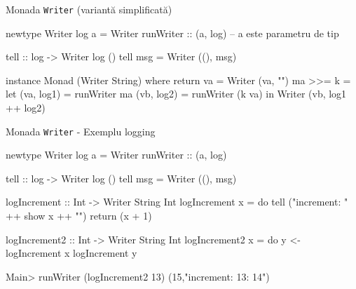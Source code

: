 \documentclass[xcolor=x11names,compress,10pt]{beamer}
\newcommand{\li}[1]{\lstinline$#1$}
\begin{document}
\begin{frame}[fragile]{Monada \li{Writer} (variantă simplificată)}


\begin{asciihs}
newtype Writer log a = Writer { runWriter :: (a, log) }
-- a este parametru de tip

tell :: log -> Writer log ()
tell msg = Writer ((), msg)
\end{asciihs}

\pause

\begin{asciihs}
instance Monad (Writer String) where
  return va =  Writer (va, "")    
  ma >>= k =   let (va, log1) = runWriter ma
                   (vb, log2) = runWriter (k va)
               in Writer (vb, log1 ++ log2)
\end{asciihs}

\end{frame}

\begin{frame}[fragile]{Monada \li{Writer} - Exemplu logging}


\begin{asciihs}
newtype Writer log a = Writer { runWriter :: (a, log) }

tell :: log -> Writer log ()
tell msg = Writer ((), msg)
\end{asciihs}

\pause

\begin{asciihs}
logIncrement :: Int -> Writer String Int
logIncrement x = do
  tell ("increment: " ++ show x ++ "\n")
  return (x + 1)

logIncrement2 :: Int -> Writer String Int
logIncrement2 x = do
  y <- logIncrement x
  logIncrement y


Main> runWriter (logIncrement2 13)
(15,"increment: 13\nincrement: 14\n")
\end{asciihs}
\end{frame}
\end{document}
